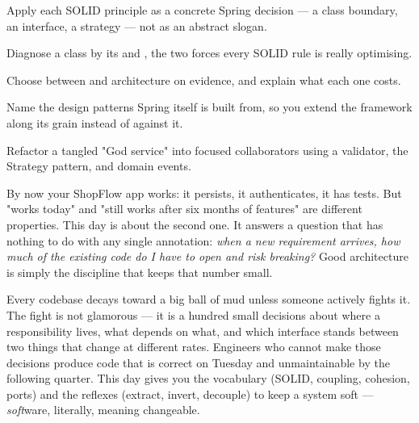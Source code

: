 
\begin{objectives}
\begin{wbitem}
  \item Apply each SOLID principle as a concrete Spring decision --- a class boundary, an interface, a strategy --- not as an abstract slogan.
  \item Diagnose a class by its  and , the two forces every SOLID rule is really optimising.
  \item Choose between  and  architecture on evidence, and explain what each one costs.
  \item Name the design patterns Spring itself is built from, so you extend the framework along its grain instead of against it.
  \item Refactor a tangled "God service" into focused collaborators using a validator, the Strategy pattern, and domain events.
\end{wbitem}
\end{objectives}


 By now your ShopFlow app works: it persists, it authenticates, it has tests. But "works today" and "still works after six months of features" are different properties. This day is about the second one. It answers a question that has nothing to do with any single annotation: \emph{when a new requirement arrives, how much of the existing code do I have to open and risk breaking?} Good architecture is simply the discipline that keeps that number small.

 Every codebase decays toward a big ball of mud unless someone actively fights it. The fight is not glamorous --- it is a hundred small decisions about where a responsibility lives, what depends on what, and which interface stands between two things that change at different rates. Engineers who cannot make those decisions produce code that is correct on Tuesday and unmaintainable by the following quarter. This day gives you the vocabulary (SOLID, coupling, cohesion, ports) and the reflexes (extract, invert, decouple) to keep a system soft --- \emph{soft}ware, literally, meaning changeable.

